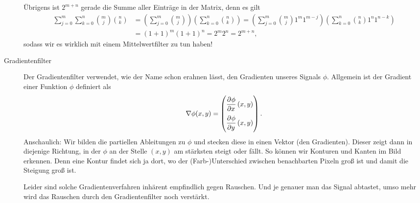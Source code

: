 \begin{example}
\begin{description}
  Übrigens ist $ 2^{m + n} $ gerade die Summe aller Einträge in der Matrix, denn es gilt
  \begin{align*}
      \sum_{j = 0}^{m} \sum_{k = 0}^{n} \binom{m}{j} \binom{n}{k}
   &= \left( \sum_{j = 0}^{m} \binom{m}{j} \right) \left( \sum_{k = 0}^{n} \binom{n}{k} \right)
    = \left( \sum_{j = 0}^{m} \binom{m}{j} 1^{m} 1^{m - j} \right) 
        \left( \sum_{k = 0}^{n} \binom{n}{k} 1^{n} 1^{n - k} \right) \\
   &= (1 + 1)^{m} (1 + 1)^{n}
    = 2^{m} 2^{n}
    = 2^{m + n},
  \end{align*}
  sodass wir es wirklich mit einem Mittelwertfilter zu tun haben!
\item [Gradientenfilter]
  Der Gradientenfilter verwendet, wie der Name schon erahnen lässt, den Gradienten unseres
  Signals $ \phi $. Allgemein ist der Gradient einer Funktion $ \phi $ definiert als
  \[
    \nabla \phi(x,y) = \begin{pmatrix}
    \dpd{\phi}{x}(x,y) \\[1em]
    \dpd{\phi}{y}(x,y)
    \end{pmatrix}.
  \]
  Anschaulich: Wir bilden die partiellen Ableitungen zu $ \phi $ und stecken diese in einen Vektor 
  (den Gradienten). Dieser zeigt dann in diejenige Richtung, in der $ \phi $ an der Stelle $ (x,y) $
  am stärksten steigt oder fällt. So können wir Konturen und Kanten im Bild erkennen. Denn eine 
  Kontur findet sich ja dort, wo der (Farb-)Unterschied zwischen benachbarten Pixeln groß ist und
  damit die Steigung groß ist.
  

  Leider sind solche Gradientenverfahren inhärent empfindlich gegen Rauschen. Und je genauer man 
  das Signal abtastet, umso mehr wird das Rauschen durch den Gradientenfilter noch verstärkt.
\end{description}
\end{example}